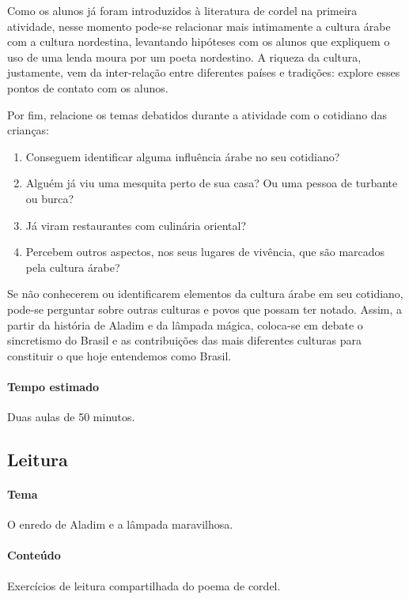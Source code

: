 \documentclass[11pt]{extarticle}
\begin{document}
Como os alunos já foram introduzidos à literatura de cordel na primeira atividade, nesse momento pode-se relacionar mais intimamente a cultura árabe com a cultura nordestina, levantando hipóteses com os alunos que expliquem o uso de uma lenda moura por um poeta nordestino. A riqueza da cultura, justamente, vem da inter-relação entre diferentes países e tradições: explore esses pontos de contato com os alunos.

Por fim, relacione os temas debatidos durante a atividade com o cotidiano das crianças: 

\begin{enumerate}
\item Conseguem identificar alguma influência árabe no seu cotidiano?

\item Alguém já viu uma mesquita perto de sua casa? Ou uma pessoa de turbante ou burca?

\item Já viram restaurantes com culinária oriental?

\item Percebem outros aspectos, nos seus lugares de vivência, que são marcados pela cultura árabe?
\end{enumerate}

Se não conhecerem ou identificarem elementos da cultura árabe em seu cotidiano, pode-se perguntar sobre outras culturas e povos que possam ter notado. Assim, a partir da história de Aladim e da lâmpada mágica, coloca-se em debate o sincretismo do Brasil e as contribuições das mais diferentes culturas para constituir o que hoje entendemos como Brasil.


\paragraph{Tempo estimado} Duas aulas de 50 minutos.

\subsection{Leitura}



\paragraph{Tema} O enredo de Aladim e a lâmpada maravilhosa.

\paragraph{Conteúdo} Exercícios de leitura compartilhada do poema de cordel.
\end{document}
